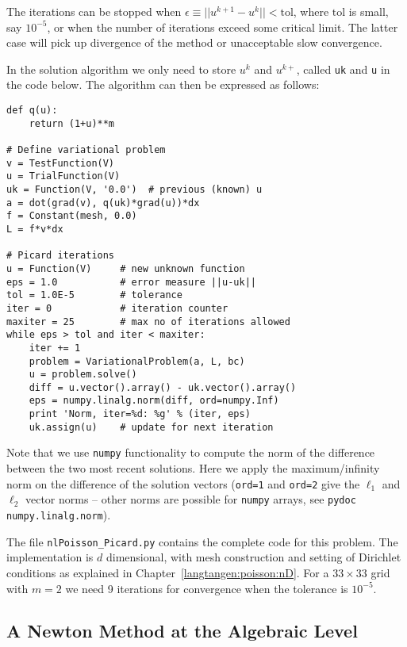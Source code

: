 The iterations can be stopped when $\epsilon\equiv ||u^{k+1}-u^k|| 
< \mbox{tol}$, where $\mbox{tol}$ is small, say $10^{-5}$, or
when the number of iterations exceed some critical limit. The latter
case will pick up divergence of the method or unacceptable slow
convergence.

In the solution algorithm we only need to store $u^k$ and $u^{k+}$,
called {\fontsize{12pt}{12pt}\texttt{uk}} and {\fontsize{12pt}{12pt}\texttt{u}} in the code below.
The algorithm can then be expressed as follows:
\begin{Verbatim}[fontsize=\fontsize{10pt}{10pt},tabsize=8,baselinestretch=1.05,
fontfamily=tt,xleftmargin=7mm]
def q(u):
    return (1+u)**m

# Define variational problem
v = TestFunction(V)
u = TrialFunction(V)
uk = Function(V, '0.0')  # previous (known) u
a = dot(grad(v), q(uk)*grad(u))*dx
f = Constant(mesh, 0.0)
L = f*v*dx

# Picard iterations
u = Function(V)     # new unknown function
eps = 1.0           # error measure ||u-uk||
tol = 1.0E-5        # tolerance
iter = 0            # iteration counter
maxiter = 25        # max no of iterations allowed
while eps > tol and iter < maxiter:
    iter += 1
    problem = VariationalProblem(a, L, bc)
    u = problem.solve()
    diff = u.vector().array() - uk.vector().array()
    eps = numpy.linalg.norm(diff, ord=numpy.Inf)
    print 'Norm, iter=%d: %g' % (iter, eps)
    uk.assign(u)    # update for next iteration
\end{Verbatim}
\noindent
Note that we use {\fontsize{12pt}{12pt}\texttt{numpy}} functionality to compute the norm of
the difference between the two most recent solutions. Here we apply
the maximum/infinity norm on the difference of the solution vectors
({\fontsize{12pt}{12pt}\texttt{ord=1}} and {\fontsize{12pt}{12pt}\texttt{ord=2}} give the $\ell_1$ and $\ell_2$ vector
norms -- other norms are possible for {\fontsize{12pt}{12pt}\texttt{numpy}} arrays, 
see {\fontsize{12pt}{12pt}\texttt{pydoc numpy.linalg.norm}}).

The file {\fontsize{12pt}{12pt}\verb!nlPoisson_Picard.py!} contains the complete code for
this problem. The implementation is $d$ dimensional, with mesh
construction and setting of Dirichlet conditions as explained in
Chapter~\ref{langtangen:poisson:nD}.
For a $33\times 33$ grid with $m=2$ we need 9 iterations for convergence
when the tolerance is $10^{-5}$.

\subsection{A Newton Method at the Algebraic Level}
\label{langtangen:nonlinear:Newton:algebraic}

